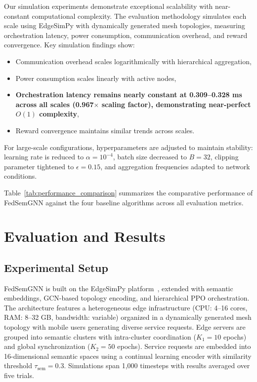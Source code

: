 \documentclass[conference]{IEEEtran}
\begin{document}
	Our simulation experiments demonstrate exceptional scalability with near-constant computational complexity. The evaluation methodology simulates each scale using EdgeSimPy with dynamically generated mesh topologies, measuring orchestration latency, power consumption, communication overhead, and reward convergence. Key simulation findings show:
	\begin{itemize}
		\item Communication overhead scales logarithmically with hierarchical aggregation,
		\item Power consumption scales linearly with active nodes,
		\item \textbf{Orchestration latency remains nearly constant at 0.309--0.328 ms across all scales (0.967$\times$ scaling factor), demonstrating near-perfect $O(1)$ complexity},
		\item Reward convergence maintains similar trends across scales.
	\end{itemize}
	
	For large-scale configurations, hyperparameters are adjusted to maintain stability: learning rate is reduced to $\alpha = 10^{-4}$, batch size decreased to $B = 32$, clipping parameter tightened to $\epsilon = 0.15$, and aggregation frequencies adapted to network conditions.
	
	Table~\ref{tab:performance_comparison} summarizes the comparative performance of FedSemGNN against the four baseline algorithms across all evaluation metrics.
	
	
	
	
	
	\section{Evaluation and Results}
	\label{sec:evaluation}
	
	\subsection{Experimental Setup}
	FedSemGNN is built on the EdgeSimPy platform~\cite{edgesimpy}, extended with semantic embeddings, GCN-based topology encoding, and hierarchical PPO orchestration. The architecture features a heterogeneous edge infrastructure (CPU: 4--16 cores, RAM: 8--32 GB, bandwidth: variable) organized in a dynamically generated mesh topology with mobile users generating diverse service requests. Edge servers are grouped into semantic clusters with intra-cluster coordination ($K_1=10$ epochs) and global synchronization ($K_2=50$ epochs). Service requests are embedded into 16-dimensional semantic spaces using a continual learning encoder with similarity threshold $\tau_{\text{sem}}=0.3$. Simulations span 1,000 timesteps with results averaged over five trials.
	
\end{document}
